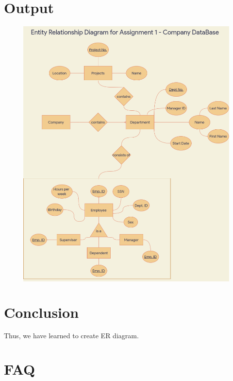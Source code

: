 \documentclass[11pt]{article}
\begin{document}
\section{Output}

\begin{figure}[H]
	\centering
	\includegraphics[scale=0.5]{./Assignment 1 ER Diagram.drawio.png}
	\caption{}
\end{figure}

\section{Conclusion}
Thus, we have learned to create ER diagram.

\section{FAQ}
\end{document}
